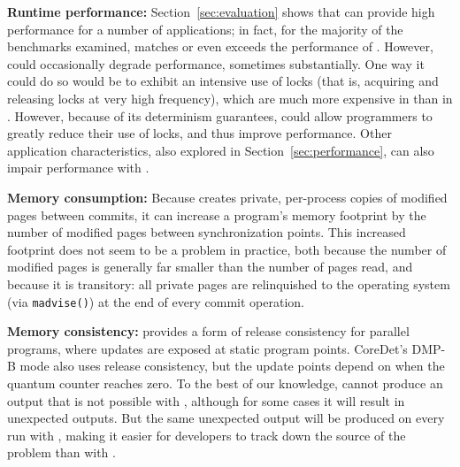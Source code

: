 \textbf{Runtime performance: }
Section~\ref{sec:evaluation} shows that \dthreads{} can provide high performance for a number of applications; in fact, for the majority of the benchmarks examined, \dthreads{} matches or even exceeds the performance of \pthreads{}. However, \dthreads{} could occasionally degrade performance, sometimes substantially. One way it could do so would be to exhibit an intensive use of locks (that is, acquiring and releasing locks at very high frequency), which are much more expensive
in \dthreads{} than in \pthreads{}. However, because of its determinism guarantees, \dthreads{} could allow programmers to greatly reduce their use of locks, and thus improve performance. Other application characteristics, also explored in Section~\ref{sec:performance}, can also impair performance
with \dthreads{}.




\textbf{Memory consumption: }
Because \dthreads{} creates private, per-process copies of modified pages between commits, it can increase a program's memory footprint by the number of modified pages between synchronization points. This increased footprint does not seem to be a problem in practice, both because the number of modified pages is generally far smaller than the number of pages read, and because it is transitory: all private pages are relinquished to the operating system (via \texttt{madvise()}) at the end of every commit operation.

\textbf{Memory consistency:} 
\dthreads{} provides a form of release consistency for parallel programs, where updates are exposed at static program points. 
CoreDet's DMP-B mode also uses release consistency, but the update points depend on when the quantum counter reaches zero.  To the best of our knowledge, \dthreads{} cannot produce an output that is not possible with \pthreads{}, although for some cases it will result in unexpected outputs.  But the same unexpected output will be produced on every run
with \dthreads{}, making it easier for developers to track down the source of the problem than with \pthreads{}.
